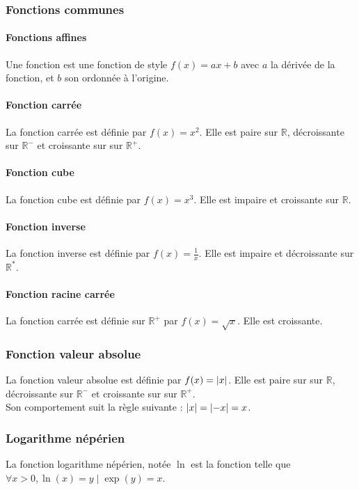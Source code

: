 \documentclass{article}
\begin{document}
\subsubsection{Fonctions communes}
\paragraph{Fonctions affines}
Une fonction est une fonction de style $f(x) = ax+b$ avec $a$ la dérivée de la fonction, et $b$ son ordonnée à l'origine.


\paragraph{Fonction carrée}
La fonction carrée est définie par $f(x) = x^2$. Elle est paire sur $\mathbb{R}$, décroissante sur $\mathbb{R^-}$ et croissante sur sur $\mathbb{R^+}$.


\paragraph{Fonction cube}
La fonction cube est définie par $f(x) = x^3$. Elle est impaire et croissante sur $\mathbb{R}$.


\paragraph{Fonction inverse}
La fonction inverse est définie par $f(x) = \frac{1}{x}$. Elle est impaire et décroissante sur $\mathbb{R^*}$.


\paragraph{Fonction racine carrée}
La fonction carrée est définie sur $\mathbb{R^+}$ par $f(x) = \sqrt{x}$. Elle est croissante.

\subsubsection{Fonction valeur absolue}
La fonction valeur absolue est définie par $f(x) = \abs{x} $. Elle est paire sur sur $\mathbb{R}$, décroissante sur $\mathbb{R^-}$ et croissante sur sur $\mathbb{R^+}$.\\
Son comportement suit la règle suivante : $\abs{x} = \abs{-x} = x$.

\subsubsection{Logarithme népérien}
La fonction logarithme népérien, notée $\ln$ est la fonction telle que $\forall x > 0, \ln(x) = y \mid \exp(y) = x$.
\end{document}
